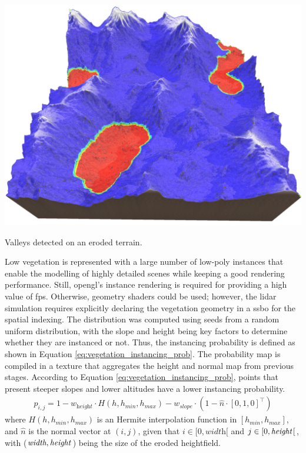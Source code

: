 \begin{marginfigure}[1.0cm]
    \centering
    \includegraphics[width=\linewidth]{figs/lidar_simulation/valley_finds.png}
	\caption{Valleys detected on an eroded terrain. }
	\label{fig:terrain_valleys}
\end{marginfigure}
Low vegetation is represented with a large number of low-poly instances that enable the modelling of highly detailed scenes while keeping a good rendering performance. Still, \acrshort{opengl}'s instance rendering is required for providing a high value of \acrshort{fps}. Otherwise, geometry shaders could be used; however, the \acrshort{lidar} simulation requires explicitly declaring the vegetation geometry in a \acrshort{ssbo} for the spatial indexing. The distribution was computed using seeds from a random uniform distribution, with the slope and height being key factors to determine whether they are instanced or not. Thus, the instancing probability is defined as shown in Equation \ref{eq:vegetation_instancing_prob}. The probability map is compiled in a texture that aggregates the height and normal map from previous stages. According to Equation \ref{eq:vegetation_instancing_prob}, points that present steeper slopes and lower altitudes have a lower instancing probability.
\begin{gather}
    \label{eq:vegetation_instancing_prob}
    p_{i, j} = 1 - w_{\textit{height}} \cdot H(h, h_{\textit{min}}, h_{\textit{max}}) - w_{\textit{slope}} \cdot (1 - \hat{n} \cdot \left[0, 1, 0\right]^\intercal)
\end{gather}
where $H(h, h_{\textit{min}}, h_{\textit{max}})$ is an Hermite interpolation function in $[h_{\textit{min}}, h_{\textit{max}}]$, and $\hat{n}$ is the normal vector at $(i, j)$, given that $i \in [0, \textit{width}[$ and $j \in [0, \textit{height}\hspace{.5mm}[$, with ($\textit{width}, \textit{height}\hspace{.5mm}$) being the size of the eroded heightfield.


